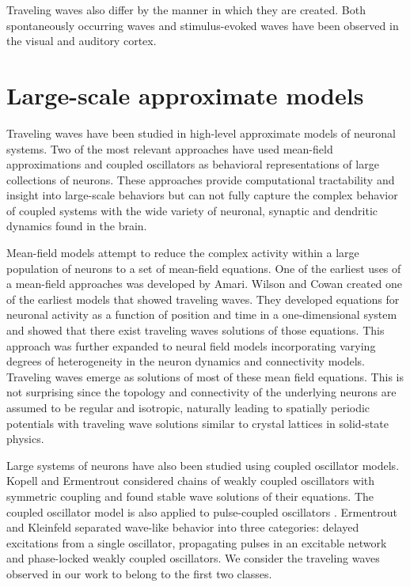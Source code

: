 Traveling waves also differ by the manner in which they are created. 
Both spontaneously occurring waves \citep{Davis2020}\citep{huang2004} and stimulus-evoked \citep{Nauhaus2009}\citep{reimer2010}\citep{Muller2014} waves have been observed in the visual and auditory cortex. 

\section{Large-scale approximate models}
Traveling waves have been studied in high-level approximate models of neuronal systems.
Two of the most relevant approaches have used mean-field approximations and coupled oscillators as behavioral representations of large collections of neurons.
These approaches provide computational tractability and insight into large-scale behaviors but can not fully capture the complex behavior of coupled systems with the wide variety of neuronal, synaptic and dendritic dynamics found in the brain.

Mean-field models attempt to reduce the complex activity within a large population of neurons to a set of mean-field equations.
One of the earliest uses of a mean-field approaches was developed by Amari\citep{Amari1972}\citep{Amari1977}.
Wilson and Cowan\citet{Wilson1973} created one of the earliest models that showed traveling waves. 
They developed equations for neuronal activity as a function of position and time in a one-dimensional system and showed that there exist traveling waves solutions of those equations.
This approach was further expanded \citep{Ermentrout1979}\citep{Sompolinsky1988}\citep{Vreeswijk1998}\citep{Faugeras2009} to neural field models incorporating varying degrees of heterogeneity in the neuron dynamics and connectivity models.
Traveling waves emerge as solutions of most of these mean field equations.
This is not surprising since the topology and connectivity of the underlying neurons are assumed to be regular and isotropic, naturally leading to spatially periodic potentials with traveling wave solutions similar to crystal lattices in solid-state physics.

Large systems of neurons have also been studied using coupled oscillator models.
Kopell and Ermentrout \citep{Kopell1986} considered chains of weakly coupled oscillators with symmetric coupling and found stable wave solutions of their equations.
The coupled oscillator model is also applied to pulse-coupled oscillators \citep{Ermentrout1990}\citep{Mirollo1990}. 
Ermentrout and Kleinfeld \citep{ermentrout2001} separated wave-like behavior into three categories: delayed excitations from a single oscillator, propagating pulses in an excitable network and phase-locked weakly coupled oscillators.
We consider the traveling waves observed in our work to belong to the first two classes.

